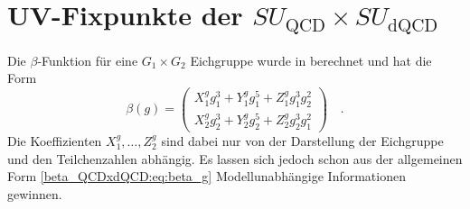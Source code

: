 \clearpage
\section{UV-Fixpunkte der $SU_\text{QCD}\times SU_\text{dQCD}$}

  Die $\beta$-Funktion für eine $G_1 \times G_2$ Eichgruppe wurde in 
  \cite{Jones} berechnet und 
  hat die Form
  \begin{equation}
   \beta (g) = \begin{pmatrix}
                     X_1^g g_1^3 + Y_1^g g_1^5 + Z_1^g g_1^3 g_2^2 \\ 
                     X_2^g g_2^3 + Y_2^g g_2^5 + Z_2^g g_2^3 g_1^2 
                    \end{pmatrix}\quad . \label{beta_QCDxdQCD:eq:beta_g}
  \end{equation}
  Die Koeffizienten $X_1^g,\ldots,Z_2^g$ sind dabei nur von der Darstellung der 
  Eichgruppe und den Teilchenzahlen abhängig. Es lassen sich jedoch schon aus 
  der allgemeinen Form \eqref{beta_QCDxdQCD:eq:beta_g} Modellunabhängige 
  Informationen gewinnen.
